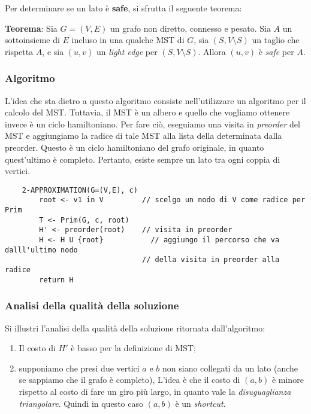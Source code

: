 Per determinare se un lato è \textbf{safe}, si sfrutta il seguente teorema:

\textbf{Teorema}: Sia $G = (V, E)$ un grafo non diretto, connesso e pesato. Sia $A$ un
sottoinsieme di $E$ incluso in una qualche MST di $G$, sia $(S, V \setminus S)$ un
taglio che rispetta $A$, e sia $(u, v)$ un \textit{light edge} per $(S, V \setminus S)$.
Allora $(u, v)$ è \textit{safe} per $A$.

\subsubsection{Algoritmo}

L'idea che sta dietro a questo algoritmo consiste nell'utilizzare un algoritmo per il calcolo
del MST. Tuttavia, il MST è un albero e quello che vogliamo ottenere invece è un
ciclo hamiltoniano. Per fare ciò, eseguiamo una visita in \textit{preorder} del MST
e aggiungiamo la radice di tale MST alla lista della determinata dalla preorder. Questo è un ciclo
hamiltoniano del grafo originale, in quanto quest'ultimo è completo. Pertanto, esiste sempre un
lato tra ogni coppia di vertici.

\begin{verbatim}
    2-APPROXIMATION(G=(V,E), c)
        root <- v1 in V         // scelgo un nodo di V come radice per Prim
        T <- Prim(G, c, root)
        H' <- preorder(root)    // visita in preorder
        H <- H U {root}           // aggiungo il percorso che va dalll'ultimo nodo
                                // della visita in preorder alla radice
        return H

\end{verbatim}

\subsubsection{Analisi della qualità della soluzione}

Si illustri l'analisi della qualità della soluzione ritornata dall'algoritmo:
\begin{enumerate}
    \item Il costo di $H'$ è basso per la definizione di MST;
    \item supponiamo che presi due vertici $a$ e $b$ non siano collegati da un lato (anche se
    sappiamo che il grafo è completo), L'idea è che il costo di $(a, b)$ è minore rispetto
    al costo di fare un giro più largo, in quanto vale la \textit{disuguaglianza triangolare}.
    Quindi in questo caso $(a, b)$ è un \textit{shortcut}.
\end{enumerate}

